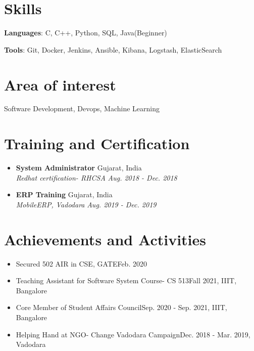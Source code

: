 \documentclass[letterpaper,11pt]{article}
\makeatletter
\newcommand{\resumeItem}[2]{
  \item\small{
    {#1}\hfill{#2}%
  }
}
\newcommand{\resumeSubheading}[4]{
\item\textbf{#1} \hfill #2\null\\
 \textit{\small#3} \hfill \textit{\small#4}%
}
\newcommand{\resumeSubHeadingListStart}{\begin{itemize}[leftmargin=*]}
\newcommand{\resumeSubHeadingListEnd}{\end{itemize}}
\newcommand{\resumeItemListStart}{\begin{itemize}}
\newcommand{\resumeItemListEnd}{\end{itemize}\vspace{-5pt}}
\makeatother
\begin{document}
\section{Skills}
 \resumeSubHeadingListStart
   \item{
     \textbf{Languages}{: C, C++, Python, SQL, Java(Beginner)}
     \\
     \item{\textbf{Tools}{: Git, Docker, Jenkins, Ansible, Kibana, Logstash, ElasticSearch}
   }}
 \resumeSubHeadingListEnd

\section{Area of interest}
\hspace{0.5cm} Software Development, Devops, Machine Learning

\section{Training and Certification}
\resumeItemListStart

\resumeSubheading
{System Administrator}{Gujarat, India}
{Redhat certification- RHCSA}{Aug. 2018 - Dec. 2018}
\resumeSubheading
{ERP Training}{Gujarat, India}
{MobileERP, Vadodara}{Aug. 2019 - Dec. 2019}
\resumeSubHeadingListEnd

\section{Achievements and Activities}
\resumeItemListStart
\resumeItem{Secured 502 AIR in CSE, GATE}{Feb. 2020}
\resumeItem
{Teaching Assistant for Software System Course- CS 513}{Fall 2021, IIIT, Bangalore}
\resumeItem{Core Member of Student Affairs Council}{Sep. 2020 - Sep. 2021, IIIT, Bangalore}
\resumeItem
{Helping Hand at NGO- Change Vadodara Campaign}{Dec. 2018 - Mar. 2019, Vadodara}
\resumeItemListEnd
\end{document}
